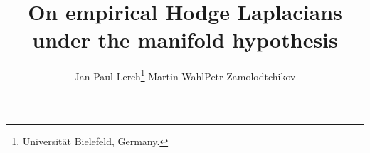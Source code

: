 \documentclass[10pt]{article}
\theoremstyle{plain}
\theoremstyle{definition}
\theoremstyle{remark}
\begin{document}
\title{On empirical Hodge Laplacians under the manifold hypothesis}
\author{Jan-Paul Lerch\thanks{Universit\"{a}t Bielefeld, Germany.} \qquad
Martin Wahl\footnotemark[1] \qquad Petr Zamolodtchikov\footnotemark[1] %
}
\date{}


\end{document}
